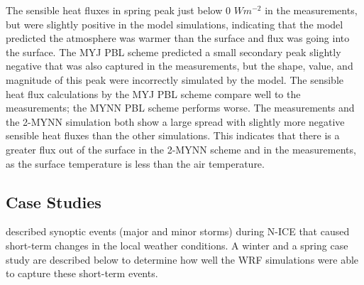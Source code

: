 The sensible heat fluxes in spring peak just below 0 $Wm^{-2}$ in the measurements, but were slightly positive in the model simulations, indicating that the model predicted the atmosphere was warmer than the surface and flux was going into the surface. The MYJ PBL scheme predicted a small secondary peak slightly negative that was also captured in the measurements, but the shape, value, and magnitude of this peak were incorrectly simulated by the model. The sensible heat flux calculations by the MYJ PBL scheme compare well to the measurements; the MYNN PBL scheme performs worse. The measurements and the 2-MYNN simulation both show a large spread with slightly more negative sensible heat fluxes than the other simulations. This indicates that there is a greater flux out of the surface in the 2-MYNN scheme and in the measurements, as the surface temperature is less than the air temperature.

\subsection{Case Studies}
\citet{cohen:2015} described synoptic events (major and minor storms) during N-ICE that caused short-term changes in the local weather conditions. A winter and a spring case study are described below to determine how well the WRF simulations were able to capture these short-term events.

